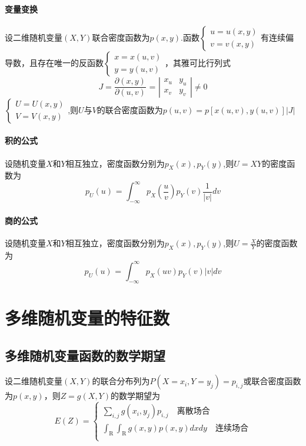     \paragraph{变量变换}
    设二维随机变量$(X,Y)$联合密度函数为$p(x,y)$.函数$\left\{ {\begin{array}{*{20}{c}}
            {u = u(x,y)} \\
            {v = v(x,y)}
        \end{array}} \right.$有连续偏导数，且存在唯一的反函数$\left\{ {\begin{array}{*{20}{c}}
            {x = x(u,v)} \\
            {y = y(u,v)}
        \end{array}} \right.$，其雅可比行列式
    $$J = \frac{{\partial (x,y)}}{{\partial (u,v)}}{\text{ = }}\left| {\begin{array}{*{20}{c}}
            {{x_u}} & {{y_u}} \\
            {{x_v}} & {{y_v}}
        \end{array}} \right| \ne 0$$
$\left\{ {\begin{array}{*{20}{c}}
            {U = U(x,y)} \\
            {V = V(x,y)}
        \end{array}} \right.$,则$U$与$V$的联合密度函数为$p(u,v) = p[x(u,v),y(u,v)]\left| J \right|$

    \paragraph{积的公式}
    设随机变量$X$和$Y$相互独立，密度函数分别为$p_X(x),p_Y(y)$,则$U = XY$的密度函数为$${p_U}(u){\text{ = }}\int_{ - \infty }^\infty  {{p_X}(\frac{u}{v}){p_Y}(v)\frac{1}{{\left| v \right|}}} dv$$

    \paragraph{商的公式}
    设随机变量$X$和$Y$相互独立，密度函数分别为$p_X(x),p_Y(y)$,则$U = \frac{X}{Y}$的密度函数为$${p_U}(u){\text{ = }}\int_{ - \infty }^\infty  {{p_X}(uv){p_Y}(v)\left| v \right|} dv$$

    \section{多维随机变量的特征数}
    \subsection{多维随机变量函数的数学期望}
    \begin{theorem}
        设二维随机变量$(X,Y)$的联合分布列为$P(X = {x_i},Y = {y_j}) = {p_{i,j}}$或联合密度函数为$p(x,y)$，则$Z = g(X,Y)$的数学期望为$$E(Z) = \left\{ \begin{gathered}
                \sum\limits_{i,j} {g({x_i},{y_j}){p_{i,j}}} \quad \text{离散场合} \\
                \int_{\text{R}}^{} {\int_{\text{R}}^{} {g(x,y)p(x,y)dxdy} }  \quad \text{连续场合} \\
            \end{gathered}  \right.$$
    \end{theorem}

